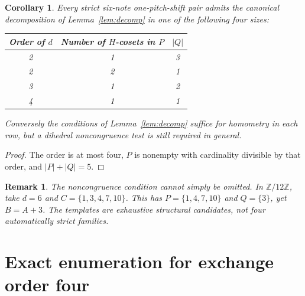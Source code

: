\documentclass[11pt]{article}
\newtheorem{corollary}[theorem]{Corollary}
\newtheorem{remark}[theorem]{Remark}
\newcommand{\Z}{\mathbb Z}
\begin{document}
\begin{corollary}\label{cor:templates}
Every strict six-note one-pitch-shift pair admits the canonical decomposition of Lemma~\ref{lem:decomp} in one of the following four sizes:
\begin{center}
\begin{tabular}{ccc}\toprule
Order of $d$ & Number of $H$-cosets in $P$ & $|Q|$\\\midrule
2&1&3\\2&2&1\\3&1&2\\4&1&1\\\bottomrule
\end{tabular}
\end{center}
Conversely the conditions of Lemma~\ref{lem:decomp} suffice for homometry in each row, but a dihedral noncongruence test is still required in general.
\end{corollary}
\begin{proof}
The order is at most four, $P$ is nonempty with cardinality divisible by that order, and $|P|+|Q|=5$.
\end{proof}
\begin{remark}
The noncongruence condition cannot simply be omitted. In $\Z/12\Z$, take $d=6$ and $C=\{1,3,4,7,10\}$. This has $P=\{1,4,7,10\}$ and $Q=\{3\}$, yet $B=A+3$. The templates are exhaustive structural candidates, not four automatically strict families.
\end{remark}

\section{Exact enumeration for exchange order four}
\end{document}
